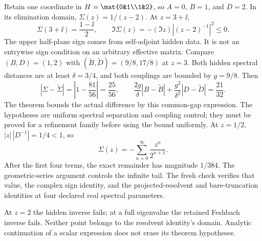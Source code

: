 Retain one coordinate in $H=\mat{0&1\\1&2}$, so $A=0$, $B=1$, and $D=2$. In its elimination domain, $\Sigma(z)=1/(z-2)$. At $z=3+\ii$,
\[
\Sigma(3+\ii)=\frac{1-\ii}{2},\qquad
\Im\Sigma(z)=-(\Im z)\left|(z-2)^{-1}\right|^2\leq0.
\]
The upper half-plane sign comes from self-adjoint hidden data. It is not an entrywise sign condition on an arbitrary effective matrix.
Compare $(B,D)=(1,2)$ with $(\widetilde B,\widetilde D)=(9/8,17/8)$ at $z=3$. Both hidden spectral distances are at least $\delta=3/4$, and both couplings are bounded by $g=9/8$. Then
\[
|\Sigma-\widetilde\Sigma|=\left|1-\frac{81}{56}\right|=\frac{25}{56},
\qquad
\frac{2g}{\delta}|B-\widetilde B|
+\frac{g^2}{\delta^2}|D-\widetilde D|=\frac{21}{32}.
\]
The theorem bounds the actual difference by this common-gap expression. The hypotheses are uniform spectral separation and coupling control; they must be proved for a refinement family before using the bound uniformly.
At $z=1/2$, $|z|\,|D^{-1}|=1/4<1$, so
\[
\Sigma(z)=-\sum_{n=0}^{\infty}\frac{z^n}{2^{n+1}}.
\]
After the first four terms, the exact remainder has magnitude $1/384$. The geometric-series argument controls the infinite tail. The fresh check verifies that value, the complex sign identity, and the projected-resolvent and bare-truncation identities at four declared real spectral parameters.

At $z=2$ the hidden inverse fails; at a full eigenvalue the retained Feshbach inverse fails. Neither point belongs to the resolvent identity's domain. Analytic continuation of a scalar expression does not erase its theorem hypotheses.

